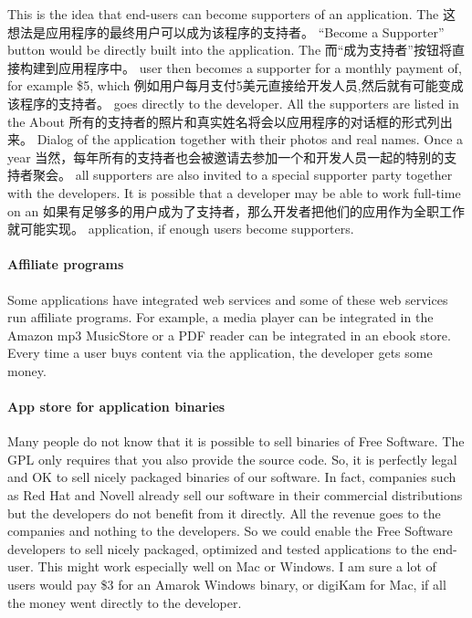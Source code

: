 This is the idea that end-users can become supporters of an application. The
这想法是应用程序的最终用户可以成为该程序的支持者。
``Become a Supporter'' button would be directly built into the application. The
而“成为支持者”按钮将直接构建到应用程序中。
user then becomes a supporter for a monthly payment of, for example \$5, which
例如用户每月支付5美元直接给开发人员,然后就有可能变成该程序的支持者。
goes directly to the developer. All the supporters are listed in the About
所有的支持者的照片和真实姓名将会以应用程序的对话框的形式列出来。
Dialog of the application together with their photos and real names. Once a year
当然，每年所有的支持者也会被邀请去参加一个和开发人员一起的特别的支持者聚会。
all supporters are also invited to a special supporter party together with the
developers. It is possible that a developer may be able to work full-time on an
如果有足够多的用户成为了支持者，那么开发者把他们的应用作为全职工作就可能实现。
application, if enough users become supporters.

\paragraph*{Affiliate programs}

Some applications have integrated web services and some of these web services
run affiliate programs. For example, a media player can be integrated in the
Amazon mp3 MusicStore or a PDF reader can be integrated in an ebook store.
Every time a user buys content via the application, the developer gets some
money.

\paragraph*{App store for application binaries}

Many people do not know that it is possible to sell binaries of Free Software.
The GPL only requires that you also provide the source code. So, it is perfectly
legal and OK to sell nicely packaged binaries of our software. In fact,
companies such as Red Hat and Novell already sell our software in their commercial distributions but the developers do not benefit from it directly. All the revenue goes to the companies and nothing to the developers. So we could enable the Free Software developers to sell nicely packaged, optimized and
tested applications to the end-user. This might work especially well on Mac or
Windows. I am sure a lot of users would pay \$3 for an Amarok Windows binary, or
digiKam for Mac, if all the money went directly to the developer.

